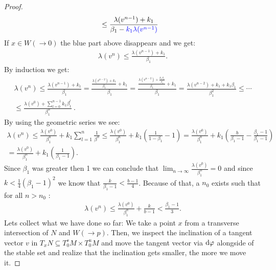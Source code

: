 \begin{proof}
\begin{align}
&\leq \frac{\lambda(v^{n-1})+k_1}
			{ \beta_1  - \color{blue} k_1 \lambda(v^{n-1}) \color{black} }  \label{eq: estimate lambda(v^n)}				
\end{align} 
If $x\in W(\to 0)$ the blue part above disappears and we get:
\begin{align*}
\lambda(v^n) \leq \frac{\lambda(v^{n-1})+k_1}{\beta_1}.
\end{align*} By induction we get:
\begin{align}
\lambda(v^n)\leq \frac{\lambda(v^{n-1})+k_1}{\beta_1}=\frac{\frac{\lambda(v^{n-2})+k_1}{\beta_1}+k_1}{\beta_1}= \frac{\frac{\lambda(v^{n-2})+\frac{k_1 \beta_1}{\beta_1}}{\beta_1}+k_1}{\beta_1} =\frac{\lambda(v^{n-2})+k_1+ k_1 \beta_1}{\beta_1^2}\leq \cdots \nonumber \\
\leq \frac{\lambda(v^0)+\sum_{l=0}^{n-1}k_1 \beta_1^l}{\beta_1^n}~. \label{eq: proof lambda lemma estimate lambda(v^n) with x=q}
\end{align} By using the geometric series we see:
\begin{align*}
\lambda(v^n)\leq \frac{\lambda(v^0)}{\beta_1^n}+k_1\sum_{l=1}^n\frac{1}{\beta^n} \leq \frac{\lambda(v^0)}{\beta_1^n}+k_1(\frac{1}{1-\beta_1}-1)=
\frac{\lambda(v^0)}{\beta_1^n}+k_1(\frac{b}{\beta_1-1}-\frac{\beta_1-1}{\beta_1-1}) \\ =\frac{\lambda(v^0)}{\beta_1^n}+k_1(\frac{1}{\beta_1-1}).
\end{align*}
Since $\beta_1$ was greater then 1 we can conclude that $\lim_{n \to \infty}\frac{\lambda(v^0)}{\beta_1^n}=0$ and since $k<\frac{1}{4}(\beta_1-1)^2$ we know that $\frac{k}{\beta_1-1}<\frac{b-1}{4}$. Because of that, a $n_0$ exists such that for all $n>n_0$ :
\begin{align*}
\lambda(v^n)\leq \frac{\lambda(v^0)}{\beta_1^n}+\frac{k}{b-1}< \frac{\beta_1-1}{3}.
\end{align*}  
Lets collect what we have done so far: We take a point $x$ from a transverse intersection of $N$ and $W(\to p)$. Then, we inspect the inclination of a tangent vector $v$ in ${T_xN\subseteq T^s_0M\times T^u_0M}$ and move the tangent vector via $\mathop{}\!\mathrm{d} \varphi$ alongside of the stable set and realize that the inclination gets smaller, the more we move it. 







\end{proof}
